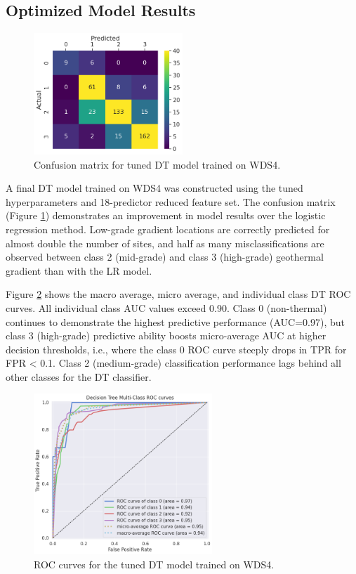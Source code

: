 \subsection{Optimized Model Results}\label{dtree_final_results}

\begin{figure}%
\centering
\includegraphics[width=0.5\textwidth]{templates/images/Figure-DT-ConfusionMatrix.png}
\singlespacing
\caption[Decision tree confusion matrix]{Confusion matrix for tuned DT model trained on WDS4.}
\label{fig:dtree_conf_matrix}
\end{figure}

A final DT model trained on WDS4 was constructed using the tuned hyperparameters and 18-predictor reduced feature set. The confusion matrix (Figure \ref{fig:dtree_conf_matrix}) demonstrates an improvement in model results over the logistic regression method. Low-grade gradient locations are correctly predicted for almost double the number of sites, and half as many misclassifications are observed between class 2 (mid-grade) and class 3 (high-grade) geothermal gradient than with the LR model.

Figure \ref{fig:dtree_auc} shows the macro average, micro average, and individual class DT ROC curves. All individual class AUC values exceed 0.90. Class 0 (non-thermal) continues to demonstrate the highest predictive performance (AUC=0.97), but class 3 (high-grade) predictive ability boosts micro-average AUC at higher decision thresholds, i.e., where the class 0 ROC curve steeply drops in TPR for FPR < 0.1. Class 2 (medium-grade) classification performance lags behind all other classes for the DT classifier.

\begin{figure}%
\centering
\includegraphics[width=0.6\textwidth]{templates/images/Figure-DT_AUC.png}
\caption[Decision tree ROC curves]{ROC curves for the tuned DT model trained on WDS4.}
\label{fig:dtree_auc}
\end{figure}

